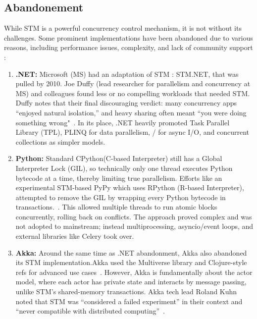 \subsection{Abandonement}

While STM is a powerful concurrency control mechanism, it is not without its challenges. Some prominent implementations have been abandoned due to various reasons, including performance issues, complexity, and lack of community support :
\begin{enumerate}
    \item \textbf{.NET:}  Microsoft (MS) had an adaptation of STM :  STM.NET, that was pulled by 2010. Joe Duffy (lead researcher for parallelism and concurrency at MS) and colleagues found less or no compelling workloads that needed STM. Duffy notes that their final discouraging verdict: many concurrency apps “enjoyed natural isolation,” and heavy sharing often meant “you were doing something wrong"~\cite{infoq.com}.  In its place, .NET heavily promoted Task Parallel Library (TPL), PLINQ for data parallelism, / for async I/O, and concurrent collections as simpler models.
    \item \textbf{Python:}  Standard CPython(C-based Interpreter) still has a Global Interpreter Lock (GIL), so technically only one thread executes Python bytecode at a time, thereby limiting true parallelism. Efforts like an experimental STM-based PyPy which uses RPython (R-based Interpreter), attempted to remove the GIL by wrapping every Python bytecode in transactions.~\cite{pypy.org}. This allowed multiple threads to run atomic blocks concurrently, rolling back on conflicts. The approach proved complex and was not adopted to mainstream; instead multiprocessing, asyncio/event loops, and external libraries like Celery took over.
    \item \textbf{Akka:} Around the same time as .NET abandonment, Akka also abandoned its STM implementation.Akka used the Multiverse library and Clojure-style refs for advanced use cases~\cite{docs.akka.io}. 
    However, Akka is fundamentally about the actor model, where each actor has private state and interacts by message passing, unlike STM’s shared-memory transactions. Akka tech lead Roland Kuhn noted that STM was “considered a failed experiment” in their context and “never compatible with distributed computing”~\cite{groups.google.com}.
\end{enumerate}
